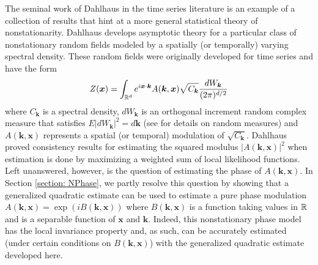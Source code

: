 \documentclass[10pt,noinfoline]{imsart}
\newcommand{\bs}{\boldsymbol}
\begin{document}
The seminal work of Dahlhaus in the time series literature \cite{dahlhaus1997fitting,dahlhaus2000likelihood}  is  an example of a collection of results that hint at a more general statistical theory of nonstationarity.  Dahlhaus develops asymptotic theory for a particular class of nonstationary random fields modeled by a spatially (or temporally) varying spectral density. These random fields were originally developed for time series \cite{priestley1965evolutionary,priestley1981spectral} and have the form 
\begin{align}
\label{eq: intro nonstat phase model}
Z(\bs x)= \int_{\Bbb R^d} e^{i\bs x\cdot \bs k} A(\bs k, \bs x)\sqrt{C_{\bs k}}\frac{dW_{\bs k}}{(2\pi)^{d/2}}
\end{align} 
where  $C_{\bs k}$ is a spectral density, $dW_{\bs k}$ is an orthogonal increment random complex measure that satisfies $E|dW_{\bs k}|^2 =  d{\bs k}$ (see \cite{Gikhman_Skorokhod_book_v1} for details on random measures) and $A({\bs k},{\bs x})$ represents a spatial (or temporal) modulation of $\sqrt{C_{\bs k}}$. 
Dahlhaus proved consistency results for estimating the squared modulus $|A({\bs k},{\bs x})|^2$ when estimation is done  by maximizing a weighted sum of local likelihood functions. Left unanswered, however, is the question of estimating the phase of $A({\bs k},{\bs x})$. In Section \ref{section: NPhase}, we partly resolve this question by showing that a generalized quadratic estimate can be used to estimate a pure phase modulation $A({\bs k},{\bs x})=\exp({iB(\bs k,\bs x)})$ where $B(\bs k,\bs x)$ is a function taking values in $\Bbb R$ and is a separable function of $\bs x$ and $\bs k$. Indeed, this nonstationary phase model has the local invariance property and, as such, can be accurately estimated (under certain conditions on $B(\bs k,\bs x)$) with the generalized quadratic estimate developed here.  
\end{document}
